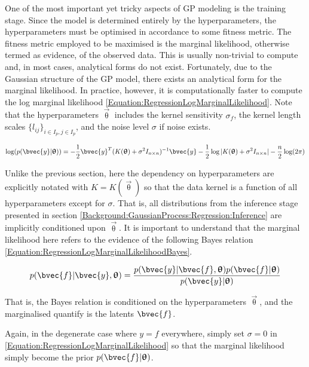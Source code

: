 				One of the most important yet tricky aspects of GP modeling is the training stage. Since the model is determined entirely by the hyperparameters, the hyperparameters must be optimised in accordance to some fitness metric. The fitness metric employed to be maximised is the marginal likelihood, otherwise termed as evidence, of the observed data. This is usually non-trivial to compute and, in most cases, analytical forms do not exist. Fortunately, due to the Gaussian structure of the GP model, there exists an analytical form for the marginal likelihood. In practice, however, it is computationally faster to compute the log marginal likelihood \eqref{Equation:RegressionLogMarginalLikelihood}. Note that the hyperparameters $\vec{\uptheta}$ includes the kernel sensitivity $\sigma_{f}$, the kernel length scales $\{l_{ij}\}_{i \in I_{p}, j \in I_{p}}$, and the noise level $\sigma$ if noise exists.
				
				\begin{equation}
					\log(p(\bvec{y} | \vec{\uptheta})) = - \frac{1}{2} \bvec{y}^{T} (K(\vec{\uptheta}) + \sigma^{2} I_{n \times n})^{-1} \bvec{y} - \frac{1}{2} \log|K(\vec{\uptheta}) + \sigma^{2} I_{n \times n}| - \frac{n}{2} \log(2 \pi)
				\label{Equation:RegressionLogMarginalLikelihood}
				\end{equation}
				
				Unlike the previous section, here the dependency on hyperparameters are explicitly notated with $K = K(\vec{\uptheta})$ so that the data kernel is a function of all hyperparameters except for $\sigma$. That is, all distributions from the inference stage presented in section \ref{Background:GaussianProcess:Regression:Inference} are implicitly conditioned upon $\vec{\uptheta}$. It is important to understand that the marginal likelihood here refers to the evidence of the following Bayes relation \eqref{Equation:RegressionLogMarginalLikelihoodBayes}.
				
				\begin{equation}
					p(\bvec{f} | \bvec{y}, \vec{\uptheta}) = \frac{p(\bvec{y} | \bvec{f}, \vec{\uptheta}) p(\bvec{f} | \vec{\uptheta})}{p(\bvec{y} | \vec{\uptheta})}
				\label{Equation:RegressionLogMarginalLikelihoodBayes}
				\end{equation}
				
				That is, the Bayes relation is conditioned on the hyperparameters $\vec{\uptheta}$, and the marginalised quantify is the latents $\bvec{f}$.
				
				Again, in the degenerate case where $y = f$ everywhere, simply set $\sigma = 0$ in \eqref{Equation:RegressionLogMarginalLikelihood} so that the marginal likelihood simply become the prior $p(\bvec{f} | \vec{\uptheta})$.
				
